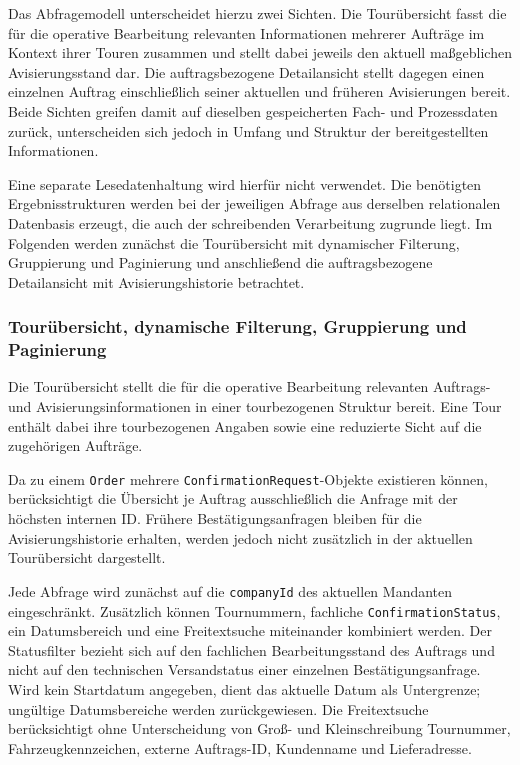Das Abfragemodell unterscheidet hierzu zwei Sichten. Die Tourübersicht fasst
die für die operative Bearbeitung relevanten Informationen mehrerer Aufträge
im Kontext ihrer Touren zusammen und stellt dabei jeweils den aktuell
maßgeblichen Avisierungsstand dar. Die auftragsbezogene Detailansicht stellt
dagegen einen einzelnen Auftrag einschließlich seiner aktuellen und früheren
Avisierungen bereit. Beide Sichten greifen damit auf dieselben gespeicherten
Fach- und Prozessdaten zurück, unterscheiden sich jedoch in Umfang und Struktur
der bereitgestellten Informationen.

Eine separate Lesedatenhaltung wird hierfür nicht verwendet. Die benötigten
Ergebnisstrukturen werden bei der jeweiligen Abfrage aus derselben relationalen
Datenbasis erzeugt, die auch der schreibenden Verarbeitung zugrunde liegt. Im
Folgenden werden zunächst die Tourübersicht mit dynamischer Filterung,
Gruppierung und Paginierung und anschließend die auftragsbezogene Detailansicht
mit Avisierungshistorie betrachtet.

\subsubsection{Tourübersicht, dynamische Filterung, Gruppierung und Paginierung}
\label{sec:touruebersicht}

Die Tourübersicht stellt die für die operative Bearbeitung relevanten
Auftrags- und Avisierungsinformationen in einer tourbezogenen Struktur bereit.
Eine Tour enthält dabei ihre tourbezogenen Angaben sowie eine reduzierte Sicht
auf die zugehörigen Aufträge.

Da zu einem \texttt{Order} mehrere \texttt{ConfirmationRequest}-Objekte
existieren können, berücksichtigt die Übersicht je Auftrag ausschließlich die
Anfrage mit der höchsten internen ID. Frühere Bestätigungsanfragen bleiben
für die Avisierungshistorie erhalten, werden jedoch nicht zusätzlich in der
aktuellen Tourübersicht dargestellt.

Jede Abfrage wird zunächst auf die \texttt{companyId} des aktuellen Mandanten
eingeschränkt. Zusätzlich können Tournummern, fachliche
\texttt{ConfirmationStatus}, ein Datumsbereich und eine Freitextsuche
miteinander kombiniert werden. Der Statusfilter bezieht sich auf den
fachlichen Bearbeitungsstand des Auftrags und nicht auf den technischen
Versandstatus einer einzelnen Bestätigungsanfrage. Wird kein Startdatum
angegeben, dient das aktuelle Datum als Untergrenze; ungültige Datumsbereiche
werden zurückgewiesen. Die Freitextsuche berücksichtigt ohne Unterscheidung
von Groß- und Kleinschreibung Tournummer, Fahrzeugkennzeichen, externe
Auftrags-ID, Kundenname und Lieferadresse.


